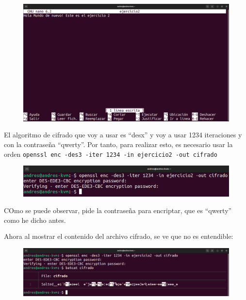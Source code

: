 \documentclass{article}
\begin{document}
\begin{figure}[H]
    \includegraphics[width=\textwidth]{imagenes/Captura desde 2022-10-19 17-33-08.png}
\end{figure}

El algoritmo de cifrado que voy a usar es ``desx'' y voy a usar 1234 iteraciones y con la contraseña ``qwerty''. Por tanto, para realizar esto, es necesario usar la orden \verb|openssl enc -des3 -iter 1234 -in ejercicio2 -out cifrado|

\begin{figure}[H]
    \includegraphics[width=\textwidth]{imagenes/Captura desde 2022-10-19 17-44-41.png}
\end{figure}

COmo se puede observar, pide la contraseña para encriptar, que es ``qwerty'' como he dicho antes. 

Ahora al mostrar el contenido del archivo cifrado, se ve que no es entendible:

\begin{figure}[H]
    \includegraphics[width=\textwidth]{imagenes/Captura desde 2022-10-19 17-44-49.png}
\end{figure}
\end{document}
